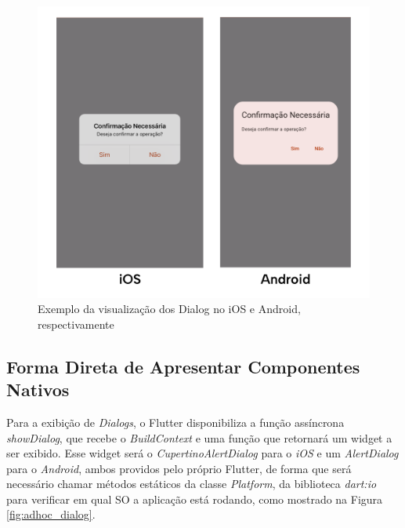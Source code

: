 \documentclass[12pt, %
openright, 
oneside, %
a4paper,    %
brazil]{facom-ufu-abntex2}
\begin{document}
\begin{figure}[ht]
    \centering
    \includegraphics[width=.65\textwidth]{figures/dialog/platforms_dialog.png}
    \caption{Exemplo da visualização dos Dialog no iOS e Android, respectivamente}
    \label{fig:plaforms_dialog}
\end{figure}

\subsection{Forma Direta de Apresentar Componentes Nativos}

Para a exibição de \textit{Dialogs}, o Flutter disponibiliza a função assíncrona \textit{showDialog}, que recebe o \textit{BuildContext} e uma função que retornará um widget a ser exibido. Esse widget será o \textit{CupertinoAlertDialog} para o \textit{iOS} e um \textit{AlertDialog} para o \textit{Android}, ambos providos pelo próprio Flutter, de forma que será necessário chamar métodos estáticos da classe \textit{Platform}, da biblioteca \textit{dart:io} para verificar em qual SO a aplicação está rodando, como mostrado na Figura \ref{fig:adhoc_dialog}.
\end{document}
